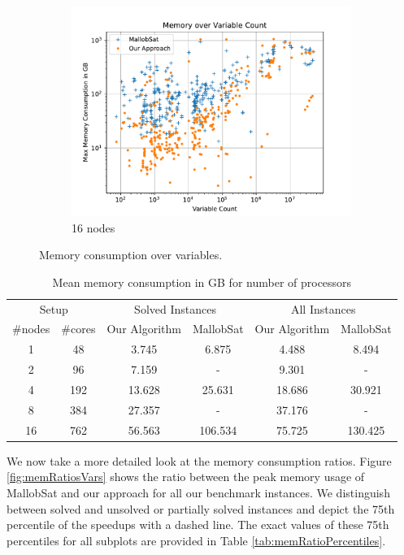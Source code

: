 \documentclass[12pt,a4paper,twoside]{scrartcl}
\numberwithin{equation}{section}
\begin{document}
\begin{figure}
\begin{subfigure}[c]{.45\textwidth}
    \includegraphics[scale=.45]{plots/16node_compare/mem_abs_over_vars.pdf}
    \caption{16 nodes}
  \end{subfigure}
  \caption{Memory consumption over variables.}
  \label{fig:memAbsVars}
\end{figure}

\begin{table}
  \center
  \begin{tabular}{ cccccc }
    \toprule
    \multicolumn{2}{c}{Setup} & \multicolumn{2}{c}{Solved Instances} & \multicolumn{2}{c}{All Instances}\\
    \#nodes & \#cores & Our Algorithm & MallobSat & Our Algorithm & MallobSat \\
    \midrule
    1  & 48  & 3.745  & 6.875   & 4.488   & 8.494\\
    2  & 96  & 7.159  & -       & 9.301   & -\\
    4  & 192 & 13.628 & 25.631  & 18.686  & 30.921\\
    8  & 384 & 27.357 & -       & 37.176  & -\\
    16 & 762 & 56.563 & 106.534 & 75.725 & 130.425\\
    \bottomrule
  \end{tabular}
  \caption{Mean memory consumption in GB for number of processors}
  \label{tab:memMean}
\end{table}

\label{sec:peakMemRatios}
We now take a more detailed look at the memory consumption ratios. Figure \ref{fig:memRatiosVars} shows the ratio between the peak memory usage of MallobSat and our approach for all our benchmark instances. We distinguish between solved and unsolved or partially solved instances and depict the 75th percentile of the speedups with a dashed line. The exact values of these 75th percentiles for all subplots are provided in Table \ref{tab:memRatioPercentiles}.
\end{document}
